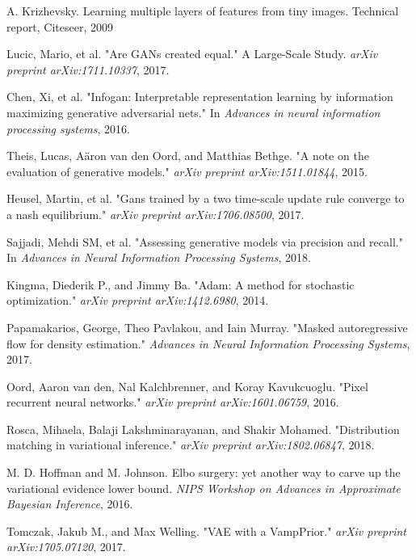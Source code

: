 \documentclass{article}
\begin{document}
\begin{thebibliography}{9}
    A. Krizhevsky. Learning multiple layers of features from tiny images. Technical report, Citeseer, 2009
    
    Lucic, Mario, et al. "Are GANs created equal." A Large-Scale Study. \textit{arXiv preprint arXiv:1711.10337}, 2017.

    Chen, Xi, et al. "Infogan: Interpretable representation learning by information maximizing generative adversarial nets." In \textit{Advances in neural information processing systems}, 2016.

    Theis, Lucas, Aäron van den Oord, and Matthias Bethge. "A note on the evaluation of generative models." \textit{arXiv preprint arXiv:1511.01844}, 2015.
    
    Heusel, Martin, et al. "Gans trained by a two time-scale update rule converge to a nash equilibrium." \textit{arXiv preprint arXiv:1706.08500}, 2017.

    Sajjadi, Mehdi SM, et al. "Assessing generative models via precision and recall." In \textit{Advances in Neural Information Processing Systems}, 2018.
    
    Kingma, Diederik P., and Jimmy Ba. "Adam: A method for stochastic optimization." \textit{arXiv preprint arXiv:1412.6980}, 2014.
    
   Papamakarios, George, Theo Pavlakou, and Iain Murray. "Masked autoregressive flow for density estimation." \textit{Advances in Neural Information Processing Systems}, 2017.
   
   Oord, Aaron van den, Nal Kalchbrenner, and Koray Kavukcuoglu. "Pixel recurrent neural networks." \textit{arXiv preprint arXiv:1601.06759}, 2016.
   
   Rosca, Mihaela, Balaji Lakshminarayanan, and Shakir Mohamed. "Distribution matching in variational inference." \textit{arXiv preprint arXiv:1802.06847}, 2018.
   
   M. D. Hoffman and M. Johnson. Elbo surgery: yet another way to carve up the variational evidence lower bound. \textit{NIPS Workshop on Advances in Approximate Bayesian Inference}, 2016.
   
  Tomczak, Jakub M., and Max Welling. "VAE with a VampPrior." \textit{arXiv preprint arXiv:1705.07120}, 2017.


\end{thebibliography}
\end{document}

